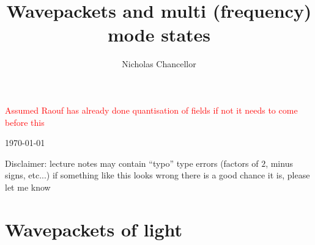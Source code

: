 \documentclass[english]{article}
\begin{document}
\title{Wavepackets and multi (frequency) mode states}
\author{Nicholas Chancellor}


\maketitle

\textcolor{red}{Assumed Raouf has already done quantisation of fields if not it needs to come before this}

\today %


{\small Disclaimer: lecture notes may contain ``typo'' type errors (factors of $2$, minus signs, etc...) if something like this looks wrong there is a good chance it is, please let me know}

\section{Wavepackets of light}
\end{document}

